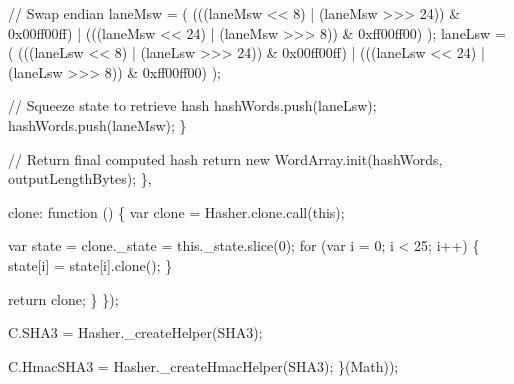 \begin{DoxyCodeInclude}
                \textcolor{comment}{// Swap endian}
                laneMsw = (
                    (((laneMsw << 8)  | (laneMsw >>> 24)) & 0x00ff00ff) |
                    (((laneMsw << 24) | (laneMsw >>> 8))  & 0xff00ff00)
                );
                laneLsw = (
                    (((laneLsw << 8)  | (laneLsw >>> 24)) & 0x00ff00ff) |
                    (((laneLsw << 24) | (laneLsw >>> 8))  & 0xff00ff00)
                );

                \textcolor{comment}{// Squeeze state to retrieve hash}
                hashWords.push(laneLsw);
                hashWords.push(laneMsw);
            \}

            \textcolor{comment}{// Return final computed hash}
            \textcolor{keywordflow}{return} \textcolor{keyword}{new} WordArray.init(hashWords, outputLengthBytes);
        \},

        clone: \textcolor{keyword}{function} () \{
            var clone = Hasher.clone.call(\textcolor{keyword}{this});

            var state = clone.\_state = this.\_state.slice(0);
            \textcolor{keywordflow}{for} (var i = 0; i < 25; i++) \{
                state[i] = state[i].clone();
            \}

            \textcolor{keywordflow}{return} clone;
        \}
    \});

    C.SHA3 = Hasher.\_createHelper(SHA3);

    C.HmacSHA3 = Hasher.\_createHmacHelper(SHA3);
\}(Math));
\end{DoxyCodeInclude}
 